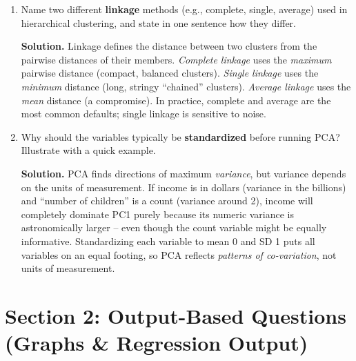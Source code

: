 \documentclass[11pt]{article}
\newcommand{\solution}[1]{%
  \par\medskip\noindent\textbf{Solution.} #1\par\medskip
}
\begin{document}
\begin{enumerate}[leftmargin=*, resume]
\item Name two different \textbf{linkage} methods (e.g., complete, single, average) used in hierarchical clustering, and state in one sentence how they differ.

\solution{Linkage defines the distance between two clusters from the pairwise distances of their members. \emph{Complete linkage} uses the \emph{maximum} pairwise distance (compact, balanced clusters). \emph{Single linkage} uses the \emph{minimum} distance (long, stringy ``chained'' clusters). \emph{Average linkage} uses the \emph{mean} distance (a compromise). In practice, complete and average are the most common defaults; single linkage is sensitive to noise.}

\item Why should the variables typically be \textbf{standardized} before running PCA? Illustrate with a quick example.

\solution{PCA finds directions of maximum \emph{variance}, but variance depends on the units of measurement. If income is in dollars (variance in the billions) and ``number of children'' is a count (variance around 2), income will completely dominate PC1 purely because its numeric variance is astronomically larger -- even though the count variable might be equally informative. Standardizing each variable to mean 0 and SD 1 puts all variables on an equal footing, so PCA reflects \emph{patterns of co-variation}, not units of measurement.}

\end{enumerate}


\newpage
\section*{Section 2: Output-Based Questions (Graphs \& Regression Output)}
\end{document}
